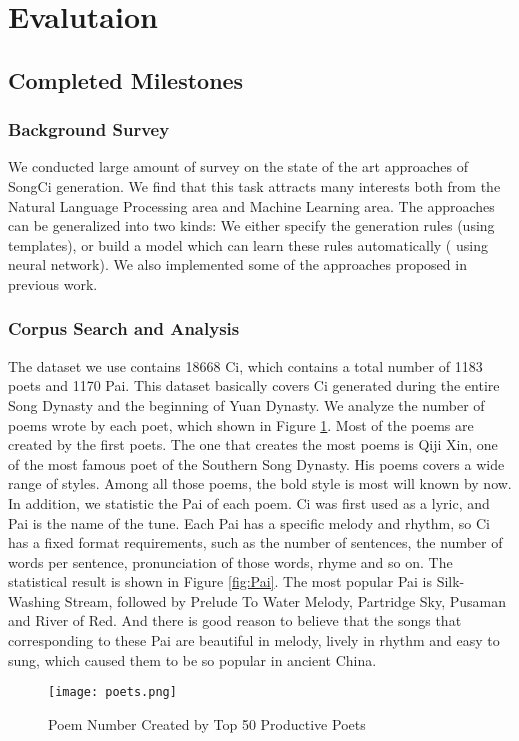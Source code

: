 \section{Evalutaion}

\subsection{Completed Milestones}
%
\subsubsection{Background Survey}
%
We conducted large amount of survey on the state of the art approaches of SongCi generation.
%
We find that this task attracts many interests both from the Natural Language Processing area and Machine Learning area.
%
The approaches can be generalized into two kinds:  We either specify the generation rules (using templates), or build a model which can learn these rules automatically ( using neural network).
%
We also implemented some of the approaches proposed in previous work.
%
%
%
\subsubsection {Corpus Search and Analysis}
%
The dataset we use contains 18668 Ci, which contains a total number of 1183 poets and 1170 Pai. This dataset basically covers Ci generated during the entire Song Dynasty and the beginning of Yuan Dynasty. We analyze the number of poems wrote by each poet, which shown in Figure \ref{fig:poet}. Most of the poems are created by the first poets. The one that creates the most poems is Qiji Xin, one of the most famous poet of the Southern Song Dynasty. His poems covers a wide range of styles. Among all those poems, the bold style is most will known by now. In addition, we statistic the Pai of each poem. Ci was first used as a lyric, and Pai is the name of the tune. Each Pai has a specific melody and rhythm, so Ci has a fixed format requirements, such as the number of sentences, the number of words per sentence, pronunciation of those words, rhyme and so on. The statistical result is shown in Figure \ref{fig:Pai}. The most popular Pai is Silk-Washing Stream, followed by Prelude To Water Melody, Partridge Sky, Pusaman and River of Red. And there is good reason to believe that the songs that corresponding to these Pai are beautiful in melody, lively in rhythm and easy to sung, which caused them to be so popular in ancient China.
\begin{figure}[htbp]
	\centering
	\texttt{[image: poets.png]}
	\caption{Poem Number Created by Top 50 Productive Poets}
	\label{fig:poet}
\end{figure}


